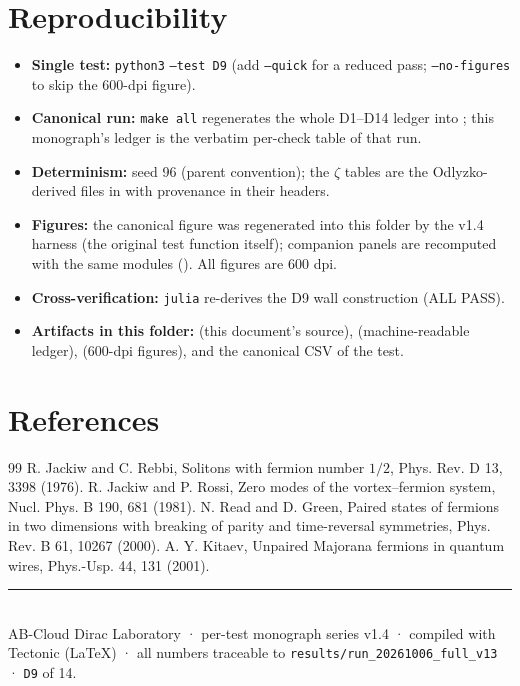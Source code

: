 \documentclass[11pt,a4paper]{article}
\begin{document}
\section{Reproducibility}
\begin{itemize}[leftmargin=1.2em, itemsep=0.15em]
\item \textbf{Single test:} \texttt{python3}  \texttt{--test D9} (add \texttt{--quick} for a reduced pass; \texttt{--no-figures} to skip the 600-dpi figure).
\item \textbf{Canonical run:} \texttt{make all} regenerates the whole D1--D14 ledger into ; this monograph's ledger is the verbatim per-check table of that run.
\item \textbf{Determinism:} seed 96 (parent convention); the $\zeta$ tables are the Odlyzko-derived files in  with provenance in their headers.
\item \textbf{Figures:} the canonical figure was regenerated into this folder by the v1.4 harness (the original test function itself); companion panels are recomputed with the same modules (). All figures are 600 dpi.
\item \textbf{Cross-verification:} \texttt{julia}  re-derives the D9 wall construction (ALL PASS).
\item \textbf{Artifacts in this folder:}  (this document's source),  (machine-readable ledger),  (600-dpi figures), and the canonical CSV of the test.
\end{itemize}

\section*{References}
\begin{thebibliography}{99}\small
{} R. Jackiw and C. Rebbi, Solitons with fermion number $1/2$, Phys. Rev. D 13, 3398 (1976).
 R. Jackiw and P. Rossi, Zero modes of the vortex--fermion system, Nucl. Phys. B 190, 681 (1981).
 N. Read and D. Green, Paired states of fermions in two dimensions with breaking of parity and time-reversal symmetries, Phys. Rev. B 61, 10267 (2000).
 A. Y. Kitaev, Unpaired Majorana fermions in quantum wires, Phys.-Usp. 44, 131 (2001).
\end{thebibliography}

\vfill
\noindent\rule{\textwidth}{0.4pt}\\[0.2em]
{\footnotesize\color{labgray} AB-Cloud Dirac Laboratory · per-test monograph series v1.4 · compiled with Tectonic (LaTeX) · all numbers traceable to \texttt{results/run\_20261006\_full\_v13} · \texttt{D9} of 14.}
\end{document}
